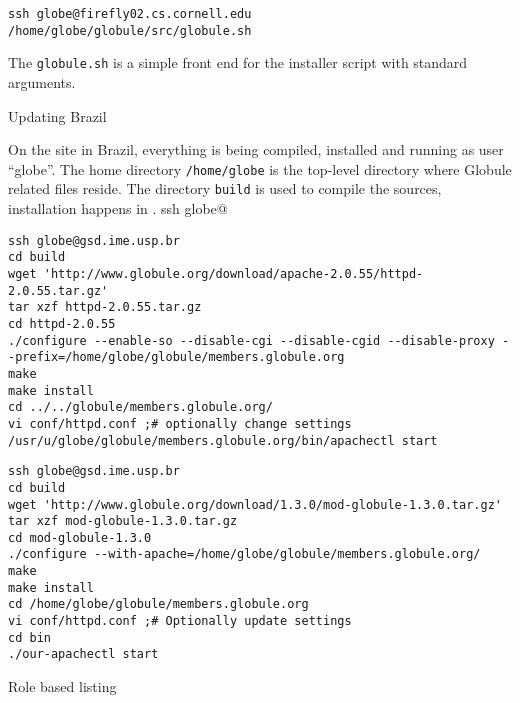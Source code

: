 \documentclass[10pt,twoside]{article}
\makeatletter
\def\subsection{\@startsection{subsection}{2}
{\z@}{-2.25ex plus -0.3ex minus -0.2ex}{0.05ex plus 0.05ex}{\normalsize\bf}}
\def\subsubsection{\@startsection{subsubsection}{3}
{\z@}{-2.25ex plus -0.3ex minus -0.2ex}{0.05ex plus 0.05ex}{\normalsize\sc}}
\makeatother
\begin{document}
\begin{verbatim}
ssh globe@firefly02.cs.cornell.edu
/home/globe/globule/src/globule.sh
\end{verbatim}

The \verb!globule.sh! is a simple front end for the installer script with
standard arguments.

\subsubsection{Updating Brazil}

On the site in Brazil, everything is being compiled, installed and running as user ``globe''.  The home directory \verb!/home/globe! is the top-level directory where Globule related files reside.  The directory \verb!build! is used to compile the sources, installation happens in \verb!!.
ssh globe@


\begin{verbatim}
ssh globe@gsd.ime.usp.br
cd build
wget 'http://www.globule.org/download/apache-2.0.55/httpd-2.0.55.tar.gz'
tar xzf httpd-2.0.55.tar.gz
cd httpd-2.0.55
./configure --enable-so --disable-cgi --disable-cgid --disable-proxy --prefix=/home/globe/globule/members.globule.org
make
make install
cd ../../globule/members.globule.org/
vi conf/httpd.conf ;# optionally change settings
/usr/u/globe/globule/members.globule.org/bin/apachectl start
\end{verbatim}

\begin{verbatim}
ssh globe@gsd.ime.usp.br
cd build
wget 'http://www.globule.org/download/1.3.0/mod-globule-1.3.0.tar.gz'
tar xzf mod-globule-1.3.0.tar.gz
cd mod-globule-1.3.0
./configure --with-apache=/home/globe/globule/members.globule.org/
make
make install
cd /home/globe/globule/members.globule.org
vi conf/httpd.conf ;# Optionally update settings
cd bin
./our-apachectl start
\end{verbatim}

\subsection{Role based listing}
\end{document}
